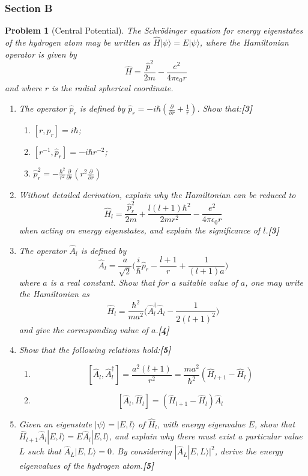 \documentclass[a4paper]{article}
\theoremstyle{new}
\newtheorem{qns}{Problem}[subsection]
\begin{document}
\subsubsection{Section B}
\begin{qns}[Central Potential]
The Schrödinger equation for energy eigenstates of the hydrogen atom may be written as $\hat{H}|\psi\rangle=E|\psi\rangle$, where the Hamiltonian operator is given by
$$\hat{H}=\frac{\hat{p}^2}{2m}-\frac{e^2}{4\pi\epsilon_0r}$$
and where $r$ is the radial spherical coordinate.
\begin{enumerate}[label=(\alph*)]
\item The operator $\hat{p}_r$ is defined by $\hat{p}_r=-i\hbar(\frac{\partial}{\partial r}+\frac{1}{r})$. Show that:\hfill\textbf{[3]}
\begin{enumerate}[label=(\roman*)]
    \item $[r,\hat{p}_r]=i\hbar$;
    \item $[r^{-1},\hat{p}_r]=-i\hbar r^{-2}$;
    \item $\hat{p}_r^2=-\frac{\hbar^2}{r^2}\frac{\partial}{\partial r}(r^2\frac{\partial}{\partial r})$
\end{enumerate}
\item Without detailed derivation, explain why the Hamiltonian can be reduced to
$$\hat{H}_l=\frac{\hat{p}_r^2}{2m}+\frac{l(l+1)\hbar^2}{2mr^2}-\frac{e^2}{4\pi\epsilon_0r}$$
when acting on energy eigenstates, and explain the significance of $l$.\hfill\textbf{[3]}
\item The operator $\hat{A}_l$ is defined by
$$\hat{A}_l=\frac{a}{\sqrt{2}}\bigg(\frac{i}{\hbar}\hat{p}_r-\frac{l+1}{r}+\frac{1}{(l+1)a}\bigg)$$
where $a$ is a real constant. Show that for a suitable value of $a$, one may write the Hamiltonian as
$$\hat{H}_l=\frac{\hbar^2}{ma^2}\bigg(\hat{A}_l^\dag\hat{A}_l-\frac{1}{2(l+1)^2}\bigg)$$
and give the corresponding value of $a$.\hfill\textbf{[4]}
\item Show that the following relations hold:\hfill\textbf{[5]}
\begin{enumerate}[label=(\roman*)]
    \item $$[\hat{A}_l,\hat{A}_l^\dag]=\frac{a^2(l+1)}{r^2}=\frac{ma^2}{\hbar^2}(\hat{H}_{l+1}-\hat{H}_l)$$
    \item 
    $$[\hat{A}_l,\hat{H}_l]=(\hat{H}_{l+1}-\hat{H}_l)\hat{A}_l$$
\end{enumerate}
\item Given an eigenstate $|\psi\rangle= |E, l\rangle$ of $\hat{H}_l$, with energy eigenvalue $E$, show that $\hat{H}_{l+1}\hat{A}_l|E,l\rangle=E\hat{A}_l|E,l\rangle$, and explain why there must exist a particular value $L$ such that $\hat{A}_L|E, L\rangle = 0$. By considering $|\hat{A}_L|E,L\rangle|^2$, derive the energy eigenvalues of the hydrogen atom.\hfill\textbf{[5]}
\end{enumerate}
\end{qns}
\end{document}
